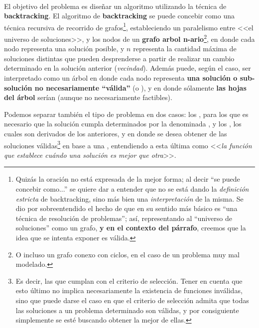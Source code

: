 \documentclass[11pt, a4paper, twoside]{article}
\begin{document}
\begin{paragraph}\


El objetivo del problema es diseñar un algoritmo utilizando la técnica de
\textbf{backtracking}. El algoritmo de \textbf{backtracking} se puede concebir
como una técnica recursiva de recorrido de grafos\footnote{Quizás la oración
no está expresada de la mejor forma; al decir ``se puede concebir como...'' se
quiere dar a entender que no se está dando la \emph{definición estricta} de
backtracking, sino más bien una \emph{interpretación} de la misma. Se dio por
sobreentendido el hecho de que en su sentido más básico es ``una técnica de
resolución de problemas''; así, representando al ``universo de soluciones''
como un grafo, \textbf{y en el contexto del párrafo}, creemos que la idea que
se intenta exponer es válida.}, estableciendo un paralelismo entre <<el
universo de soluciones>>, y los nodos de un \textbf{grafo arbol n-ario}\footnote{
O incluso un grafo conexo con ciclos, en el caso de un problema muy mal modelado.}, en
donde cada nodo representa una solución posible, y $n$ representa la cantidad
máxima de soluciones distintas que pueden desprenderse a partir de realizar un
cambio determinado en la solución anterior (\emph{vecindad}). Además puede,
según el caso, ser interpretado como un árbol en donde cada nodo representa
\textbf{una solución o sub-solución no necesariamente ``válida''} (o ), y en
donde sólamente \textbf{las hojas del árbol} serían
 (aunque no necesariamente factibles).

Podemos separar también el tipo de problema en dos casos: los
, para los que es necesario que la
solución cumpla  determinados por la
denominada , y los
, los cuales son derivados de los
anteriores, y en donde se desea obtener  de las
soluciones válidas\footnote{ Es decir, las que cumplan con el criterio de
selección. Tener en cuenta que esto último no implica necesariamente la
existencia de funciones inválidas, sino que puede darse el caso en que el
criterio de selección admita que todas las soluciones a un problema determinado
son válidas, y por consiguiente simplemente se esté buscando obtener la mejor de
ellas.} en base a una , entendiendo a esta
última como <<\emph{la función que establece cuándo una solución es mejor que
otra}>>.

\end{paragraph}
\end{document}
